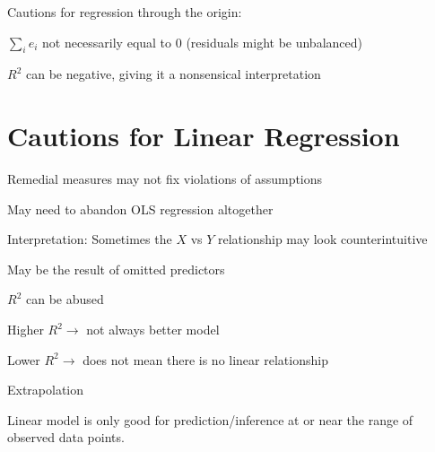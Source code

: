 \documentclass[12pt]{notes}
\begin{document}
\nspace
{} 

\begin{minipage}[l][3cm][c]{\textwidth}

\end{minipage}

\nspace
Cautions for regression through the origin:
\bi
\item $\sum_ie_i$ not necessarily equal to 0 (residuals might be unbalanced)
\item $R^2$ can be negative, giving it a nonsensical interpretation\
\ei

\section{Cautions for Linear Regression}
\bi
\item Remedial measures may not fix violations of assumptions
\bi
\item May need to abandon OLS regression altogether
\ei
\item Interpretation: Sometimes the $X$ vs $Y$ relationship may look counterintuitive
\bi
\item May be the result of omitted predictors
\ei
\item $R^2$ can be abused
\bi
\item Higher $R^2 \rightarrow$ not always better model
\item Lower $R^2 \rightarrow$ does not mean there is no linear relationship 
\ei
\item Extrapolation
\bi
\item Linear model is only good for prediction/inference at or near the range of observed data points. 
\ei
\ei

\nspace
{}

\begin{minipage}[l][3cm][c]{\textwidth}

\end{minipage}
\end{document}
